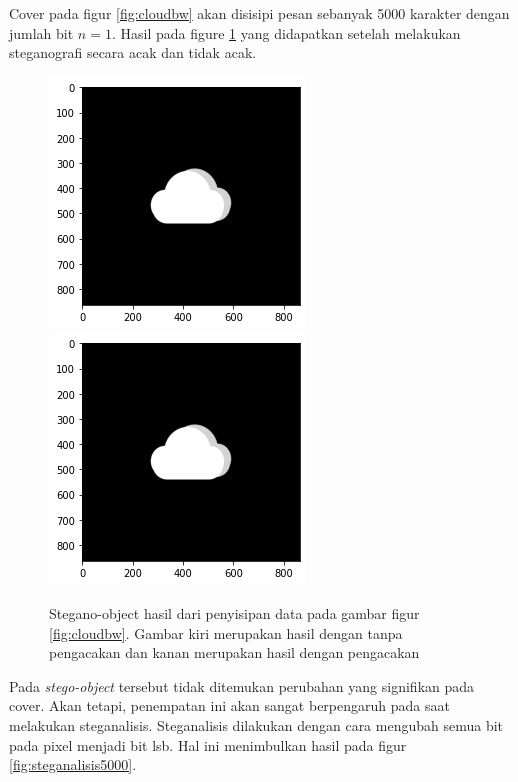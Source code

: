 \documentclass[10pt,conference]{IEEEtran}
\theoremstyle{definition}
\begin{document}
Cover pada figur \ref{fig:cloudbw} akan disisipi pesan sebanyak 5000 karakter dengan jumlah bit $n = 1$. Hasil pada figure \ref{fig:result} yang didapatkan setelah melakukan steganografi secara acak dan
tidak acak.

\begin{figure}
    \centerline{
        \includegraphics[width=0.4\columnwidth]{cloud-norandom-5000-gs.png}
        \includegraphics[width=0.4\columnwidth]{cloud-random-5000-gs.png}
    }
    \caption{Stegano-object hasil dari penyisipan data pada gambar figur \ref{fig:cloudbw}. Gambar kiri merupakan hasil dengan tanpa pengacakan dan kanan merupakan hasil dengan pengacakan}
    \label{fig:result} 
\end{figure}

Pada \emph{stego-object} tersebut tidak ditemukan perubahan yang signifikan pada cover. Akan tetapi, penempatan ini akan sangat berpengaruh pada saat melakukan steganalisis. Steganalisis dilakukan dengan
cara mengubah semua bit pada pixel menjadi bit lsb. Hal ini menimbulkan hasil pada figur \ref{fig:steganalisis5000}.
\end{document}
